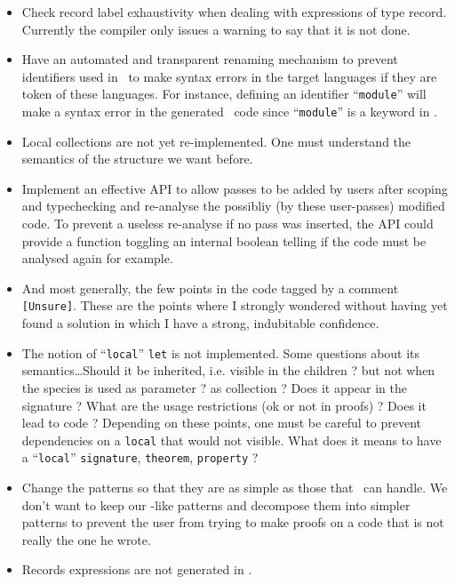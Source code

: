\begin{itemize}
\item Check record label exhaustivity when dealing with expressions of
  type record. Currently the compiler only issues a warning to say
  that it is not done.
  
\item Have an automated and transparent renaming mechanism to prevent
  identifiers used in \focalize\ to make syntax errors in the target
  languages if they are token of these languages. For instance,
  defining an identifier ``{\tt module}'' will make a syntax error in
  the generated \ocaml\ code since ``{\tt module}'' is a keyword in
  \ocaml.

\item Local collections are not yet re-implemented. One must
  understand the semantics of the structure we want before.

\item Implement an effective API to allow passes to be added by users
  after scoping and typechecking and re-analyse the possibliy (by
  these user-passes) modified code. To prevent a useless re-analyse if
  no pass was inserted, the API could provide a function toggling an
  internal boolean telling if the code must be analysed again for
  example.

\item And most generally, the few points in the code tagged by a
  comment  {\tt [Unsure]}. These are the points where I strongly
  wondered without having yet found a solution in which I have a
  strong, indubitable confidence.

\item The notion of ``{\tt local}'' {\tt let} is not implemented. Some
  questions about its semantics\ldots Should it be inherited,
  i.e. visible in the children ? but not when the species is used as
  parameter ? as collection ? Does it appear in the signature ? What
  are the usage restrictions (ok or not in proofs) ? Does it lead to
  code ? Depending on these points, one must be careful to prevent
  dependencies on a {\tt local} that would not visible. What does it
  means to have a ``{\tt local}'' {\tt signature}, {\tt theorem},
  {\tt property} ?

\item Change the patterns so that they are as simple as those that
  \coq\ can handle. We don't want to keep our \ocaml-like patterns and
  decompose them into simpler patterns to prevent the user from trying
  to make proofs on a code that is not really the one he wrote.

\item Records expressions are not generated in \coq.
\end{itemize}
